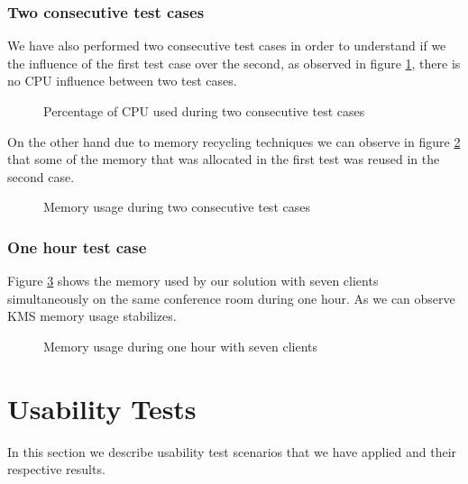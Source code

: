 \subsubsection{Two consecutive test cases}


We have also performed two consecutive test cases in order to understand if we the influence of the first test case over the second, as observed in figure \ref{fig:test_two_times_cpu}, there is no \ac{CPU} influence between two test cases.

  \begin{figure}[!htb]
  \begin{center}
    
  \end{center}
  \caption{Percentage of CPU used during two consecutive test cases}
  \label{fig:test_two_times_cpu}
\end{figure}

On the other hand due to memory recycling techniques we can observe in figure \ref{fig:test_two_times_mem} that some of the memory that was allocated in the first test was reused in the second case.

\begin{figure}[!htb]
  \begin{center}
    
  \end{center}
  \caption{Memory usage during two consecutive test cases}
  \label{fig:test_two_times_mem}
\end{figure}

\subsubsection{One hour test case}


   Figure \ref{fig:test_hour_mem} shows the memory used by our solution with seven clients simultaneously on the same conference room during one hour. As we can observe \ac{KMS} memory usage stabilizes.


  \begin{figure}[!htb]
  \begin{center}
    
  \end{center}
  \caption{Memory usage during one hour with seven clients}
  \label{fig:test_hour_mem}
\end{figure}





\section {Usability Tests}
     In this section we describe usability test scenarios that we have applied and their respective results.


